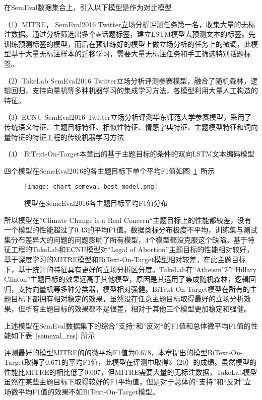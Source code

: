 在SemEval数据集合上，引入以下模型是作为对比模型

（1）MITRE， SemEval2016 Twitter立场分析评测任务第一名，收集大量的无标注数据。通过分析筛选出多个\#话题标签，建立LSTM模型去预测文本的标签。先训练预测标签的模型，而后在预训练好的模型上做立场分析的任务上的微调，此模型基于大量无标注样本的迁移学习，需要大量无标注任务和手工筛选特别话题标签。

（2）TakeLab   SemEval2016 Twitter立场分析评测参赛模型，融合了随机森林，逻辑回归，支持向量机等多种机器学习的集成学习方法，各模型利用大量人工构造的特征。

（3）ECNU  SemEval2016 Twitter立场分析评测华东师范大学参赛模型，采用了传统语义特征、主题目标特征、相似性特征、情感字典特征、主题模型特征和词向量特征的特征工程的传统机器学习方法

（4） BiText-On-Target本章出的基于主题目标的条件的双向LSTM文本编码模型

四个模型在SemeEval2016的各主题目标下单个平均F1值如图~\ref{chart_semeval_best_model}~所示
\begin{figure}[htbp]
	\centering
	\texttt{[image: chart\_semeval\_best\_model.png]}
	\caption[rnn_vanish]{模型在SemeEval2016各主题目标平均F1值分布}
	\label{chart_semeval_best_model}
\end{figure}
所以模型在”Climate Change is a Real Concern“主题目标上的性能都较差，没有一个模型的性能超过了0.43的平均F1值。数据类标分布极度不平均，训练集与测试集分布差异大的问题的问题影响了所有模型，4个模型都没克服这个缺陷。基于特征工程的TakeLab和ECNU模型对“Legal of Abortion”主题目标的性能相对较好，基于深度学习的MITRE模型和BiText-On-Target模型相对较差，在此主题目标下，基于统计的特征具有更好的立场分析区分度。TakeLab在“Atheism”和“Hillary Clinton”主题目标的效果远高于其他模型，原因是其运用了集成随机森林，逻辑回归，支持向量机等多种分类器，模型相对强健。BiText-On-Target模型在所有的主题目标下都拥有相对稳定的效果，虽然没在任意主题目标取得最好的立场分析效果，但所有主题目标的效果都不是很差，相对于其他三个模型更加稳定和强健。

上述模型在SemEval数据集下的综合”支持“和”反对“的F1值和总体微平均F1值的性能如下表~\ref{semeval_res}~所示

评测最好的模型MITRE的的微平均F1值为0.678，本章提出的模型BiText-On-Target取得了0.671的平均F1值，此模型在评测中取得3（20）的成绩。虽然模型的性能比MITRE的相比低了0.007，但MITRE需要大量的无标注数据，TakeLab模型虽然在某些主题目标下取得较好的F1平均值，但是对于总体的“支持”和“反对”立场微平均F1值的效果不如BiText-On-Target模型。

